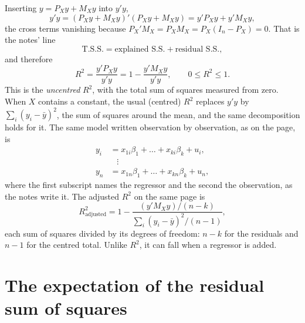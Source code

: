 \documentclass[11pt]{article}
\begin{document}
Inserting $y = P_{X}y + M_{X}y$ into $y'y$,
\[ y'y = (P_{X}y + M_{X}y)'(P_{X}y + M_{X}y) = y'P_{X}y + y'M_{X}y , \]
the cross terms vanishing because $P_{X}'M_{X} = P_{X}M_{X} = P_{X}(I_{n}-P_{X}) = 0$.
That is the notes' line
\[ \text{T.S.S.} = \text{explained S.S.} + \text{residual S.S.}, \]
and therefore
\[ R^{2} = \frac{y'P_{X}y}{y'y} = 1 - \frac{y'M_{X}y}{y'y}, \qquad 0\le R^{2}\le 1. \]
This is the \emph{uncentred} $R^{2}$, with the total sum of squares measured from
zero. When $X$ contains a constant, the usual (centred) $R^{2}$ replaces $y'y$ by
$\sum_{i}(y_{i}-\bar{y})^{2}$, the sum of squares around the mean, and the same
decomposition holds for it.
The same model written observation by observation, as on the page, is
\[
\begin{aligned}
  y_{i}   &= x_{1i}\beta_{1} + \dots + x_{ki}\beta_{k} + u_{i},\\
          &\;\;\;\vdots\\
  y_{n}   &= x_{1n}\beta_{1} + \dots + x_{kn}\beta_{k} + u_{n},
\end{aligned}
\]
where the first subscript names the regressor and the second the observation, as
the notes write it. The adjusted $R^{2}$ on the same page is
\[ R^{2}_{\text{adjusted}} = 1 - \frac{(y'M_{X}y)/(n-k)}{\sum_{i}(y_{i}-\bar{y})^{2}/(n-1)} , \]
each sum of squares divided by its degrees of freedom: $n-k$ for the residuals and
$n-1$ for the centred total. Unlike $R^{2}$, it can fall when a regressor is added.

\section{The expectation of the residual sum of squares}
\end{document}
